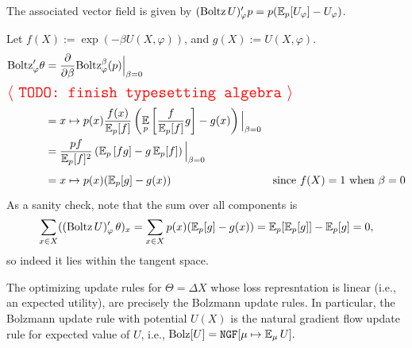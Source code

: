 \begin{prop}
	The associated vector field is given by
	$
		(\mathrm{Boltz}\,U)'_\varphi p = p (\operatorname*{\mathbb{E}}_p[U_\varphi] - U_\varphi )
	$.
\end{prop}
\begin{lproof}
	Let $f(X) := \exp(-\beta U(X,\varphi))$, and $g(X) := U(X,\varphi)$.
	\begin{align*}
		\mathrm{Boltz}'_\varphi\theta &= \frac{\partial}{\partial \beta} \mathrm{Boltz}^\beta_\varphi(p) \Big|_{\beta=0} \\
	\intertext{\TODO[TODO: finish typesetting algebra]}
		&= x \mapsto
			p(x) \frac{f(x)}{\Ex_p[f]}
				\left(\Ex_p\left[ \frac{f}{\Ex_{p}[f]} g\right] - g(x) \right)
				\Big|_{\beta=0}
				\\
		&= \frac{pf}{\Ex_p[f]^2}
			\left(\Ex\nolimits_p\left[ f g\right] - g \Ex\nolimits_{p}[f] \right)
			\Big|_{\beta=0} \\
		&= x \mapsto p(x) (\Ex\nolimits_p[g] - g(x)) &
			\text{since $f(X) = 1$ when $\beta=0$}
	\end{align*}
	As a sanity check, note that the sum over all components is
	\[ \sum_{x \in X} ((\mathrm{Boltz}\,U)'_\varphi\, \theta)_x
		 = \sum_{x \in X} p(x) (\operatorname*{\mathbb{E}}\nolimits_p[g] - g(x))
		 = \operatorname*{\mathbb{E}}\nolimits_p[ \operatorname*{\mathbb{E}}\nolimits_p [ g ]] - \operatorname*{\mathbb{E}}\nolimits_p [g] = 0,
	 \]
	 so indeed it lies within the tangent space.
\end{lproof}


\begin{prop}
	The optimizing update rules for $\Theta = \Delta X$ whose loss represntation is linear (i.e., an expected utility), are precisely the Bolzmann update rules.
	In particular, the Bolzmann update rule with potential $U(X)$ is the natural gradient flow update rule for expected value of $U$, i.e.,
	\(
		\mathrm{Bolz}[U] =
		\mathtt{NGF}[\mu\mapsto\operatorname*{\mathbb{E}}_\mu U] .
	\)
\end{prop}


